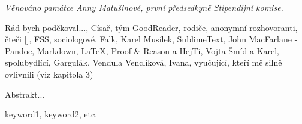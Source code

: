 \documentclass[12pt,twoside,draft]{fithesis2}
\begin{document}
\FrontMatter
\ThesisTitlePage

\begin{ThesisDeclaration}
\DeclarationText
\AdvisorName
\end{ThesisDeclaration}

\begin{ThesisDedication}
\vspace*{10cm}
\noindent
\emph{Věnováno památce Anny Matušinové, \newline první předsedkyně Stipendijní komise.}

\newpage
\thispagestyle{empty}
\mbox{}

\end{ThesisDedication}

\begin{ThesisThanks}
Rád bych poděkoval..., Císař, tým GoodReader, rodiče, anonymní rozhovoranti, čteči [], FSS, sociologové, Falk, Karel Musílek, SublimeText, John MacFarlane - Pandoc, Markdown, LaTeX, Proof \& Reason a HejTi, Vojta Šmíd a Karel, spolubydlící, Gargulák, Vendula Venclíková, Ivana, vyučující, kteří mě silně ovlivnili (viz kapitola 3)
\end{ThesisThanks}

\begin{ThesisAbstract}
Abstrakt...
\end{ThesisAbstract}

\begin{ThesisKeyWords}
keyword1, keyword2, etc.
\end{ThesisKeyWords}

\MainMatter

\tableofcontents          %







\end{document}
